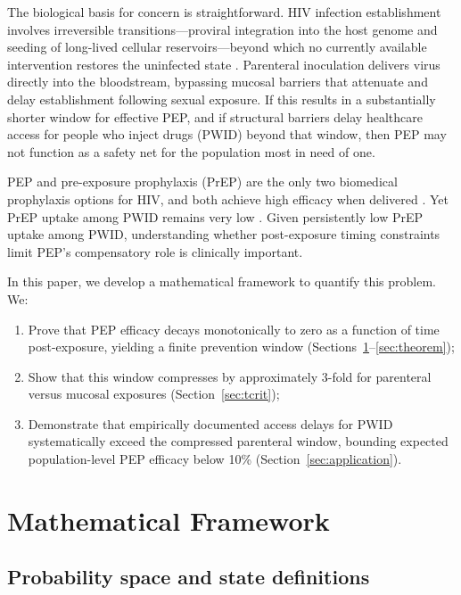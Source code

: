 \documentclass[12pt,a4paper]{article}
\theoremstyle{plain}
\theoremstyle{definition}
\theoremstyle{remark}
\begin{document}
The biological basis for concern is straightforward. HIV infection establishment involves irreversible transitions---proviral integration into the host genome and seeding of long-lived cellular reservoirs---beyond which no currently available intervention restores the uninfected state \citep{ref:McMichael2010,ref:Wahl2023,ref:Siliciano2015}. Parenteral inoculation delivers virus directly into the bloodstream, bypassing mucosal barriers that attenuate and delay establishment following sexual exposure. If this results in a substantially shorter window for effective PEP, and if structural barriers delay healthcare access for people who inject drugs (PWID) beyond that window, then PEP may not function as a safety net for the population most in need of one.

PEP and pre-exposure prophylaxis (PrEP) are the only two biomedical prophylaxis options for HIV, and both achieve high efficacy when delivered \citep{ref:Grant2010,ref:Anderson2012}. Yet PrEP uptake among PWID remains very low \citep{ref:Baugher2025,ref:Strathdee2020}. Given persistently low PrEP uptake among PWID, understanding whether post-exposure timing constraints limit PEP's compensatory role is clinically important.

In this paper, we develop a mathematical framework to quantify this problem. We:
\begin{enumerate}
    \item Prove that PEP efficacy decays monotonically to zero as a function of time post-exposure, yielding a finite prevention window (Sections~\ref{sec:framework}--\ref{sec:theorem});
    \item Show that this window compresses by approximately 3-fold for parenteral versus mucosal exposures (Section~\ref{sec:tcrit});
    \item Demonstrate that empirically documented access delays for PWID systematically exceed the compressed parenteral window, bounding expected population-level PEP efficacy below 10\% (Section~\ref{sec:application}).
\end{enumerate}


\section{Mathematical Framework}\label{sec:framework}

\subsection{Probability space and state definitions}\label{sec:prob-space}
\end{document}
